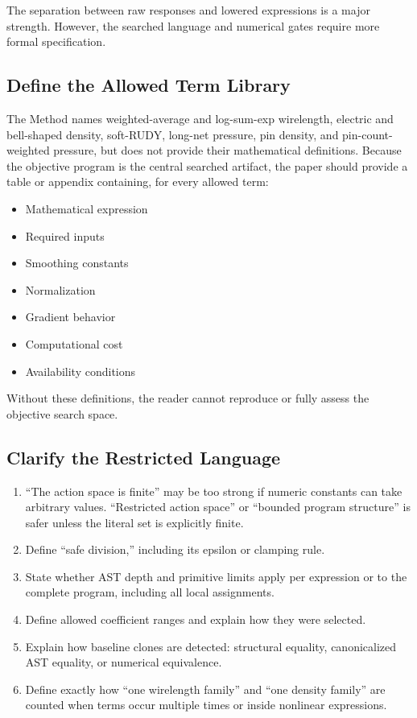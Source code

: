 \documentclass[11pt]{article}
\begin{document}
The separation between raw responses and lowered expressions is a major
strength. However, the searched language and numerical gates require more
formal specification.

\subsection{Define the Allowed Term Library}

The Method names weighted-average and log-sum-exp wirelength, electric and
bell-shaped density, soft-RUDY, long-net pressure, pin density, and
pin-count-weighted pressure, but does not provide their mathematical
definitions. Because the objective program is the central searched artifact,
the paper should provide a table or appendix containing, for every allowed
term:

\begin{itemize}
  \item Mathematical expression
  \item Required inputs
  \item Smoothing constants
  \item Normalization
  \item Gradient behavior
  \item Computational cost
  \item Availability conditions
\end{itemize}

Without these definitions, the reader cannot reproduce or fully assess the
objective search space.

\subsection{Clarify the Restricted Language}

\begin{enumerate}
  \item ``The action space is finite'' may be too strong if numeric constants
  can take arbitrary values. ``Restricted action space'' or ``bounded program
  structure'' is safer unless the literal set is explicitly finite.

  \item Define ``safe division,'' including its epsilon or clamping rule.

  \item State whether AST depth and primitive limits apply per expression or to
  the complete program, including all local assignments.

  \item Define allowed coefficient ranges and explain how they were selected.

  \item Explain how baseline clones are detected: structural equality,
  canonicalized AST equality, or numerical equivalence.

  \item Define exactly how ``one wirelength family'' and ``one density family''
  are counted when terms occur multiple times or inside nonlinear expressions.
\end{enumerate}
\end{document}

